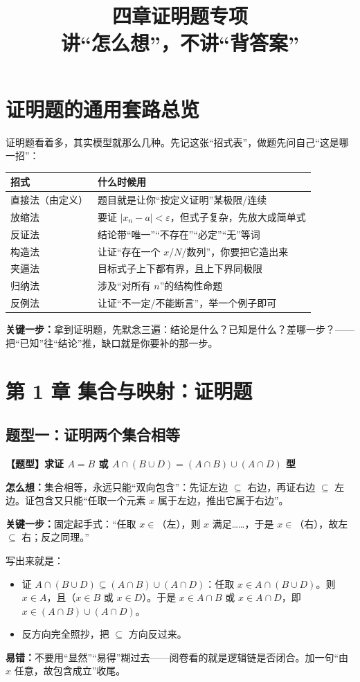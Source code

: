 ﻿\documentclass[11pt,a4paper,UTF8]{ctexart}
\title{四章证明题专项\\[4pt]\large 讲“怎么想”，不讲“背答案”}
\author{}
\date{}
\newcommand{\eps}{\varepsilon}
\newcommand{\thm}[1]{\par\smallskip\noindent\colorbox{blue!8}{\textbf{【题型】#1}}\par\smallskip}
\newcommand{\think}[1]{\par\smallskip\noindent\textcolor{purple!75!black}{\textbf{怎么想：}#1}\par\smallskip}
\newcommand{\key}[1]{\par\smallskip\noindent\colorbox{yellow!22}{\textbf{关键一步：}#1}\par\smallskip}
\newcommand{\pit}[1]{\par\smallskip\noindent\textcolor{red!70!black}{\textbf{易错：}#1}\par\smallskip}
\begin{document}
\maketitle
\tableofcontents\newpage

\section{证明题的通用套路总览}

证明题看着多，其实模型就那么几种。先记这张“招式表”，做题先问自己“这是哪一招”：

\begin{center}
\begin{tabular}{p{3cm}|p{9cm}}
招式 & 什么时候用\\\hline
直接法（由定义） & 题目就是让你“按定义证明”某极限/连续\\\hline
放缩法 & 要证 $|x_n-a|<\eps$，但式子复杂，先放大成简单式\\\hline
反证法 & 结论带“唯一”“不存在”“必定”“无”等词\\\hline
构造法 & 让证“存在一个 $x$/$N$/数列”，你要把它造出来\\\hline
夹逼法 & 目标式子上下都有界，且上下界同极限\\\hline
归纳法 & 涉及“对所有 $n$”的结构性命题\\\hline
反例法 & 让证“不一定/不能断言”，举一个例子即可\\\hline
\end{tabular}
\end{center}

\key{拿到证明题，先默念三遍：结论是什么？已知是什么？差哪一步？——把“已知”往“结论”推，缺口就是你要补的那一步。}

\section{第 1 章 集合与映射：证明题}

\subsection{题型一：证明两个集合相等}

\thm{求证 $A=B$ 或 $A\cap(B\cup D)=(A\cap B)\cup(A\cap D)$ 型}
\think{集合相等，永远只能“双向包含”：先证左边 $\subseteq$ 右边，再证右边 $\subseteq$ 左边。证包含又只能“任取一个元素 $x$ 属于左边，推出它属于右边”。}
\key{固定起手式：“任取 $x\in$（左），则 $x$ 满足……，于是 $x\in$（右），故左 $\subseteq$ 右；反之同理。”}
写出来就是：
\begin{itemize}[leftmargin=1.4em]
\item 证 $A\cap(B\cup D)\subseteq(A\cap B)\cup(A\cap D)$：任取 $x\in A\cap(B\cup D)$。则 $x\in A$，且（$x\in B$ 或 $x\in D$）。于是 $x\in A\cap B$ 或 $x\in A\cap D$，即 $x\in(A\cap B)\cup(A\cap D)$。
\item 反方向完全照抄，把 $\subseteq$ 方向反过来。
\end{itemize}
\pit{不要用“显然”“易得”糊过去——阅卷看的就是逻辑链是否闭合。加一句“由 $x$ 任意，故包含成立”收尾。}
\end{document}
